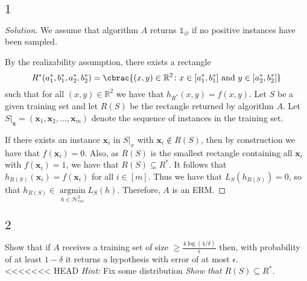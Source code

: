 \documentclass[10pt, a4paper, twoside]{amsart}
\newcommand{\R}{\ensuremath{\mathbb{R}}}
\DeclarePairedDelimiter\cbrac\{\}
\renewcommand{\c}{\ensuremath{\colon}}
\newcommand{\se}{\ensuremath{\subseteq}}
\newcommand{\Ind}{\ensuremath{\mathbb{1}}}
\newcommand{\argmin}{\operatorname*{argmin}}
\newenvironment{solution}
               {\let\oldqedsymbol=\qedsymbol
                \renewcommand{\qedsymbol}{$\blacktriangleleft$}
                \begin{proof}[Solution]}
               {\end{proof}
                \renewcommand{\qedsymbol}{\oldqedsymbol}}
\begin{document}
\subsection*{$1$}
\begin{solution}
We assume that algorithm $A$ returns $\Ind_{\varnothing}$ if no positive instances have been sampled.

By the realizability assumption, there exists a rectangle 
\begin{equation*}
R^*(a_1^*,b_1^*,a_2^*,b_2^*)=\cbrac{(x,y)\in \R^2 \c x \in [a_1^*,b_1^*] \text{ and }y \in [a_2^*, b_2^*]}
\end{equation*}
such that for all $(x, y) \in \R^2$ we have that
$h_{R^*}(x, y)=f(x, y)$. Let $S$ be a given training set and let $R(S)$ be the rectangle returned by algorithm $A$. 
Let $S|_{\mathbf{x}}=(\mathbf{x}_1, \mathbf{x}_2, \ldots, \mathbf{x}_m)$ denote the sequence of instances in the training set.

If there exists an instance $\mathbf{x}_i$ in $S|_{x}$ with $\mathbf{x}_i \notin R(S)$, 
then by construction we have that $f(\mathbf{x}_i)=0$.
Also, as $R(S)$ is the smallest rectangle containing all $\mathbf{x}_i$ with $f(\mathbf{x}_i)=1$,
we have that $R(S)\se R^*$. It follows that $h_{R(S)}(\mathbf{x}_i)=f(\mathbf{x}_i)$ for all $i \in [m]$.
Thus we have that $L_S(h_{R(S)})=0$, so that $h_{R(S)} \in \argmin\limits_{h \in \mathcal{H}^2_{rec}}L_S(h)$.
Therefore, $A$ is an ERM.
\end{solution}

\subsection*{$2$}
Show that if $A$ receives a training set of size $\geq \frac{4 \log (4/\delta)}{\epsilon}$ then, with probability of at least $1-\delta$ it returns a hypothesis with error  of at most $\epsilon$.\\
<<<<<<< HEAD
\textit{Hint:} Fix some distribution
\textit{Show that $R(S)\subseteq R^*$.}\\
\end{document}
